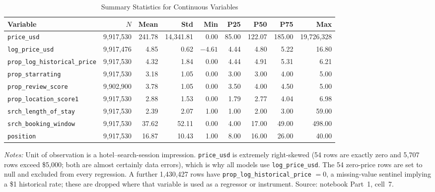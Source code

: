 \documentclass[11pt]{article}
\newcommand{\code}[1]{\texttt{\small #1}}
\begin{document}
\begin{table}[htbp]
  \centering
  \caption{Summary Statistics for Continuous Variables}
  \label{tab:summary}
  \small
  \begin{tabular}{lrrrrrrrr}
    \toprule
    Variable & $N$ & Mean & Std & Min & P25 & P50 & P75 & Max \\
    \midrule
    \code{price\_usd}                 & 9,917,530 & 241.78 & 14,341.81 & 0.00 & 85.00 & 122.07 & 185.00 & 19,726,328 \\
    \code{log\_price\_usd}            & 9,917,476 & 4.85 & 0.62 & $-4.61$ & 4.44 & 4.80 & 5.22 & 16.80 \\
    \code{prop\_log\_historical\_price} & 9,917,530 & 4.32 & 1.84 & 0.00 & 4.44 & 4.91 & 5.31 & 6.21 \\
    \code{prop\_starrating}           & 9,917,530 & 3.18 & 1.05 & 0.00 & 3.00 & 3.00 & 4.00 & 5.00 \\
    \code{prop\_review\_score}        & 9,902,900 & 3.78 & 1.05 & 0.00 & 3.50 & 4.00 & 4.50 & 5.00 \\
    \code{prop\_location\_score1}     & 9,917,530 & 2.88 & 1.53 & 0.00 & 1.79 & 2.77 & 4.04 & 6.98 \\
    \code{srch\_length\_of\_stay}     & 9,917,530 & 2.39 & 2.07 & 1.00 & 1.00 & 2.00 & 3.00 & 59.00 \\
    \code{srch\_booking\_window}      & 9,917,530 & 37.62 & 52.11 & 0.00 & 4.00 & 17.00 & 49.00 & 498.00 \\
    \code{position}                   & 9,917,530 & 16.87 & 10.43 & 1.00 & 8.00 & 16.00 & 26.00 & 40.00 \\
    \bottomrule
  \end{tabular}
  \vspace{0.6ex}
  \begin{minipage}{0.95\textwidth}
  \footnotesize \textit{Notes:} Unit of observation is a hotel--search-session
  impression. \code{price\_usd} is extremely right-skewed (54 rows are exactly
  zero and 5,707 rows exceed \$5,000; both are almost certainly data errors),
  which is why all models use \code{log\_price\_usd}. The 54 zero-price rows
  are set to null and excluded from every regression. A further 1,430,427 rows
  have \code{prop\_log\_historical\_price} $= 0$, a missing-value sentinel
  implying a \$1 historical rate; these are dropped where that variable is used
  as a regressor or instrument. Source: notebook Part~1, cell~7.
  \end{minipage}
\end{table}
\end{document}
